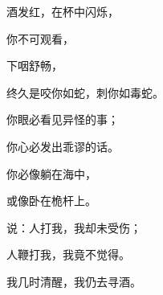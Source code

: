 {\par }{\Q {}酒发红，在杯中闪烁，
\par }{\Q 你不可观看，
\par }{下咽舒畅，
\par }{\Q 终久是咬你如蛇，刺你如毒蛇。
\par }{\Q {}你眼必看见异怪的事；
\par }{\Q 你心必发出乖谬的话。
\par }{\Q {}你必像躺在海中，
\par }{\Q 或像卧在桅杆上。
\par }{\Q {}说：人打我，我却未受伤；
\par }{\Q 人鞭打我，我竟不觉得。
\par }{\Q 我几时清醒，我仍去寻酒。

}
